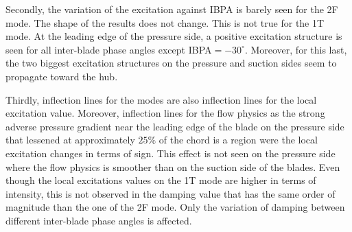 Secondly, the variation of the excitation against IBPA
is barely seen for the 2F mode. The shape of the
results does not change. This is not true for the
1T mode. At the leading edge of the pressure side,
a positive excitation structure is seen for all inter-blade phase
angles except
\mbox{IBPA$=-30^\circ$}. Moreover, for this last, 
the two biggest excitation structures on the pressure 
and suction sides seem to propagate toward the hub.

Thirdly, inflection lines
for the modes are also inflection lines for the local excitation
value. Moreover, inflection lines for the flow physics as the
strong adverse pressure gradient near the leading edge of the blade
on the pressure side that lessened at approximately $25\%$ of the chord
is a region were the local excitation changes in terms of sign.
This effect is not seen on the pressure side where the flow physics
is smoother than on the suction side of the blades. Even though the
local excitations values on the 1T mode are higher in terms of
intensity, this is not observed in the damping value that
has the same order of magnitude than the one of the 2F mode.
Only the variation of damping between different inter-blade phase angles
is affected. 

